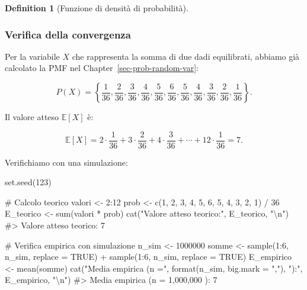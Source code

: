 \documentclass[
  letterpaper,
  DIV=11,
  numbers=noendperiod,
  oneside]{scrreprt}
\newenvironment{Shaded}{\begin{snugshade}}{\end{snugshade}}
\newcommand{\AttributeTok}[1]{\textcolor[rgb]{0.40,0.45,0.13}{#1}}
\newcommand{\CommentTok}[1]{\textcolor[rgb]{0.37,0.37,0.37}{#1}}
\newcommand{\ConstantTok}[1]{\textcolor[rgb]{0.56,0.35,0.01}{#1}}
\newcommand{\DecValTok}[1]{\textcolor[rgb]{0.68,0.00,0.00}{#1}}
\newcommand{\FunctionTok}[1]{\textcolor[rgb]{0.28,0.35,0.67}{#1}}
\newcommand{\NormalTok}[1]{\textcolor[rgb]{0.00,0.23,0.31}{#1}}
\newcommand{\OtherTok}[1]{\textcolor[rgb]{0.00,0.23,0.31}{#1}}
\newcommand{\SpecialCharTok}[1]{\textcolor[rgb]{0.37,0.37,0.37}{#1}}
\newcommand{\StringTok}[1]{\textcolor[rgb]{0.13,0.47,0.30}{#1}}
\theoremstyle{definition}
\theoremstyle{plain}
\theoremstyle{definition}
\newtheorem{definition}{Definition}[chapter]
\theoremstyle{remark}
\begin{document}
\begin{definition}[Funzione di densità di
probabilità]
\begin{tcolorbox}
\subsubsection*{Verifica della
convergenza}\label{verifica-della-convergenza}

Per la variabile \(X\) che rappresenta la somma di due dadi equilibrati,
abbiamo già calcolato la PMF nel Chapter~\ref{sec-prob-random-var}:

\[
P(X) = \left\{\frac{1}{36}, \frac{2}{36}, \frac{3}{36}, \frac{4}{36}, \frac{5}{36}, \frac{6}{36}, \frac{5}{36}, \frac{4}{36}, \frac{3}{36}, \frac{2}{36}, \frac{1}{36}\right\}.
\]

Il valore atteso \(\mathbb{E}[X]\) è:

\[
\mathbb{E}[X] = 2 \cdot \frac{1}{36} + 3 \cdot \frac{2}{36} + 4 \cdot \frac{3}{36} + \cdots + 12 \cdot \frac{1}{36} = 7.
\]

Verifichiamo con una simulazione:

\begin{Shaded}
\begin{Highlighting}[]
\FunctionTok{set.seed}\NormalTok{(}\DecValTok{123}\NormalTok{)}

\CommentTok{\# Calcolo teorico}
\NormalTok{valori }\OtherTok{\textless{}{-}} \DecValTok{2}\SpecialCharTok{:}\DecValTok{12}
\NormalTok{prob }\OtherTok{\textless{}{-}} \FunctionTok{c}\NormalTok{(}\DecValTok{1}\NormalTok{, }\DecValTok{2}\NormalTok{, }\DecValTok{3}\NormalTok{, }\DecValTok{4}\NormalTok{, }\DecValTok{5}\NormalTok{, }\DecValTok{6}\NormalTok{, }\DecValTok{5}\NormalTok{, }\DecValTok{4}\NormalTok{, }\DecValTok{3}\NormalTok{, }\DecValTok{2}\NormalTok{, }\DecValTok{1}\NormalTok{) }\SpecialCharTok{/} \DecValTok{36}
\NormalTok{E\_teorico }\OtherTok{\textless{}{-}} \FunctionTok{sum}\NormalTok{(valori }\SpecialCharTok{*}\NormalTok{ prob)}
\FunctionTok{cat}\NormalTok{(}\StringTok{"Valore atteso teorico:"}\NormalTok{, E\_teorico, }\StringTok{"}\SpecialCharTok{\textbackslash{}n}\StringTok{"}\NormalTok{)}
\CommentTok{\#\textgreater{} Valore atteso teorico: 7}

\CommentTok{\# Verifica empirica con simulazione}
\NormalTok{n\_sim }\OtherTok{\textless{}{-}} \DecValTok{1000000}
\NormalTok{somme }\OtherTok{\textless{}{-}} \FunctionTok{sample}\NormalTok{(}\DecValTok{1}\SpecialCharTok{:}\DecValTok{6}\NormalTok{, n\_sim, }\AttributeTok{replace =} \ConstantTok{TRUE}\NormalTok{) }\SpecialCharTok{+} \FunctionTok{sample}\NormalTok{(}\DecValTok{1}\SpecialCharTok{:}\DecValTok{6}\NormalTok{, n\_sim, }\AttributeTok{replace =} \ConstantTok{TRUE}\NormalTok{)}
\NormalTok{E\_empirico }\OtherTok{\textless{}{-}} \FunctionTok{mean}\NormalTok{(somme)}
\FunctionTok{cat}\NormalTok{(}\StringTok{"Media empirica (n ="}\NormalTok{, }\FunctionTok{format}\NormalTok{(n\_sim, }\AttributeTok{big.mark =} \StringTok{","}\NormalTok{), }\StringTok{"):"}\NormalTok{, E\_empirico, }\StringTok{"}\SpecialCharTok{\textbackslash{}n}\StringTok{"}\NormalTok{)}
\CommentTok{\#\textgreater{} Media empirica (n = 1,000,000 ): 7}
\end{Highlighting}
\end{Shaded}


\end{tcolorbox}
\end{definition}
\end{document}
